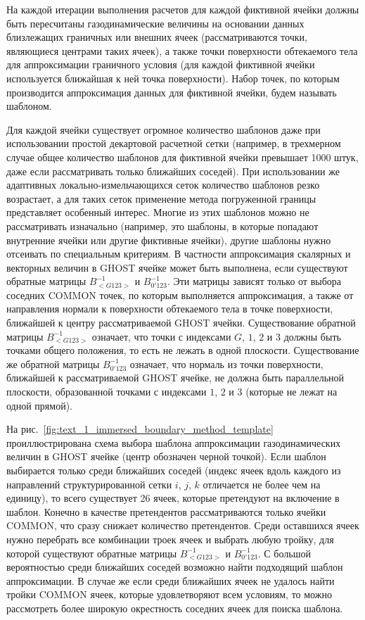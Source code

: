 
На каждой итерации выполнения расчетов для каждой фиктивной ячейки должны быть пересчитаны газодинамические величины на основании данных близлежащих граничных или внешних ячеек (рассматриваются точки, являющиеся центрами таких ячеек), а также точки поверхности обтекаемого тела для аппроксимации граничного условия (для каждой фиктивной ячейки используется ближайшая к ней точка поверхности).
Набор точек, по которым производится аппроксимация данных для фиктивной ячейки, будем называть шаблоном\label{term:ibm_template}.

Для каждой ячейки существует огромное количество шаблонов даже при использовании простой декартовой расчетной сетки\label{term:mesh_descartes} (например, в трехмерном случае общее количество шаблонов для фиктивной ячейки превышает 1000 штук, даже если рассматривать только ближайших соседей).
При использовании же адаптивных локально-измельчающихся сеток\label{term:mesh_adaptive} \cite{Wackers2011AMR,Zhou2014Refinement,Plas2015Refinement} количество шаблонов резко возрастает, а для таких сеток применение метода погруженной границы представляет особенный интерес.
Многие из этих шаблонов можно не рассматривать изначально (например, это шаблоны, в которые попадают внутренние ячейки или другие фиктивные ячейки), другие шаблоны нужно отсеивать по специальным критериям.
В частности аппроксимация скалярных и векторных величин в GHOST ячейке может быть выполнена, если существуют обратные матрицы $B_{<G123>}^{-1}$ и $B_{0'123}^{-1}$.
Эти матрицы зависят только от выбора соседних COMMON точек, по которым выполняется аппроксимация, а также от направления нормали к поверхности обтекаемого тела в точке поверхности, ближайшей к центру рассматриваемой GHOST ячейки.
Существование обратной матрицы $B_{<G123>}^{-1}$ означает, что точки с индексами $G$, $1$, $2$ и $3$ должны быть точками общего положения, то есть не лежать в одной плоскости.
Существование же обратной матрицы $B_{0'123}^{-1}$ означает, что нормаль из точки поверхности, ближайшей к рассматриваемой GHOST ячейке, не должна быть параллельной плоскости, образованной точками с индексами $1$, $2$ и $3$ (которые не лежат на одной прямой).

На рис.~\ref{fig:text_1_immersed_boundary_method_template} проиллюстрирована схема выбора шаблона аппроксимации газодинамических величин в GHOST ячейке (центр обозначен черной точкой).
Если шаблон выбирается только среди ближайших соседей (индекс ячеек вдоль каждого из направлений структурированной сетки $i$, $j$, $k$ отличается не более чем на единицу), то всего существует 26 ячеек, которые претендуют на включение в шаблон.
Конечно в качестве претендентов рассматриваются только ячейки COMMON, что сразу снижает количество претендентов.
Среди оставшихся ячеек нужно перебрать все комбинации троек ячеек и выбрать любую тройку, для которой существуют обратные матрицы $B_{<G123>}^{-1}$ и $B_{0'123}^{-1}$.
С большой вероятностью среди ближайших соседей возможно найти подходящий шаблон аппроксимации.
В случае же если среди ближайших ячеек не удалось найти тройки COMMON ячеек, которые удовлетворяют всем условиям, то можно рассмотреть более широкую окрестность соседних ячеек для поиска шаблона.

